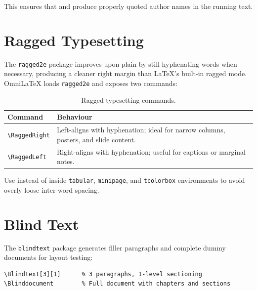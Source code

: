 This ensures that  and  produce properly
quoted author names in the running text.

\section{Ragged Typesetting}

The \texttt{ragged2e} package improves upon plain  by
still hyphenating words when necessary, producing a cleaner right margin
than \LaTeX's built-in ragged mode.  OmniLaTeX loads \texttt{ragged2e}
and exposes two commands:

\begin{table}[htbp]
  \centering
  \caption{Ragged typesetting commands.}
  \label{tab:ragged}
  \begin{tabular}{@{}lp{}@{}}
    \toprule
    Command          & Behaviour \\
    \midrule
    \texttt{\textbackslash RaggedRight} & Left-aligns with hyphenation; ideal for
      narrow columns, posters, and slide content. \\
    \texttt{\textbackslash RaggedLeft}  & Right-aligns with hyphenation; useful for
      captions or marginal notes. \\
    \bottomrule
  \end{tabular}
\end{table}

Use  instead of  inside
\texttt{tabular}, \texttt{minipage}, and \texttt{tcolorbox} environments
to avoid overly loose inter-word spacing.

\section{Blind Text}

The \texttt{blindtext} package generates filler paragraphs and complete
dummy documents for layout testing:

\begin{verbatim}
\Blindtext[3][1]      % 3 paragraphs, 1-level sectioning
\Blinddocument        % Full document with chapters and sections
\end{verbatim}

